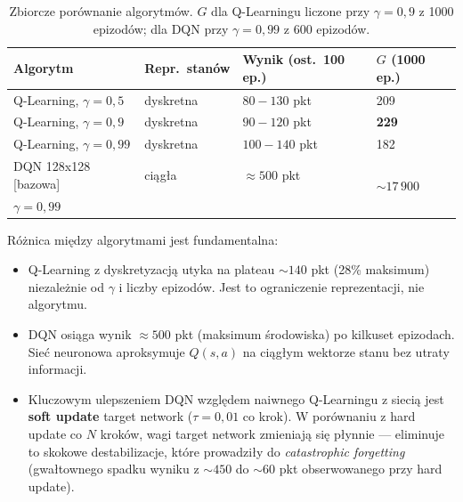 \documentclass[12pt,a4paper]{article}
\begin{document}
\begin{table}[H]
    \centering
    \begin{tabular}{p{4.5cm}p{3cm}p{3cm}p{2.5cm}}
        \toprule
        \textbf{Algorytm} & \textbf{Repr.\ stanów} & \textbf{Wynik (ost.\ 100 ep.)} & \textbf{$G$ (1000 ep.)} \\
        \midrule
        Q-Learning, $\gamma = 0{,}5$ & dyskretna & $80{-}130$ pkt  & 209 \\
        Q-Learning, $\gamma = 0{,}9$ & dyskretna & $90{-}120$ pkt  & \textbf{229} \\
        Q-Learning, $\gamma = 0{,}99$ & dyskretna & $100{-}140$ pkt & 182 \\
        \midrule
        DQN 128x128 [bazowa]          & ciągła & $\approx 500$ pkt & \multirow{2}{*}{$\sim 17\,900$} \\
        \quad $\gamma = 0{,}99$       &        &                   & \\
        \bottomrule
    \end{tabular}
    \caption{Zbiorcze porównanie algorytmów. $G$ dla Q-Learningu liczone przy $\gamma=0{,}9$
    z 1000 epizodów; dla DQN przy $\gamma=0{,}99$ z 600 epizodów.}
\end{table}

Różnica między algorytmami jest fundamentalna:

\begin{itemize}
    \item Q-Learning z dyskretyzacją utyka na plateau $\sim 140$ pkt
    (28\% maksimum) niezależnie od $\gamma$ i liczby epizodów.
    Jest to ograniczenie reprezentacji, nie algorytmu.

    \item DQN osiąga wynik $\approx 500$ pkt (maksimum środowiska)
    po kilkuset epizodach. Sieć neuronowa aproksymuje $Q(s,a)$
    na ciągłym wektorze stanu bez utraty informacji.

    \item Kluczowym ulepszeniem DQN względem naiwnego Q-Learningu
    z siecią jest \textbf{soft update} target network ($\tau = 0{,}01$
    co krok). W porównaniu z hard update co $N$ kroków, wagi
    target network zmieniają się płynnie — eliminuje to skokowe
    destabilizacje, które prowadziły do \textit{catastrophic forgetting}
    (gwałtownego spadku wyniku z $\sim 450$ do $\sim 60$ pkt
    obserwowanego przy hard update).
\end{itemize}

\end{document}
